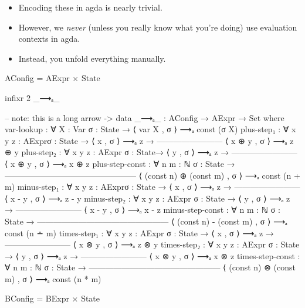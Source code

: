 \documentclass{lecturenotes}
\begin{document}
\begin{itemize}
\item Encoding these in agda is nearly trivial.
\item However, we \emph{never} (unless you really know what you're doing) use evaluation contexts in agda.
\item Instead, you unfold everything manually.
\end{itemize}
\begin{code}
AConfig = AExpr × State

infixr 2 _⟶ₐ_

-- note: this is a long arrow \-->
data _⟶ₐ_ : AConfig → AExpr → Set where
  var-lookup : ∀ {X : Var} {σ : State} →
    ⟨ var X , σ ⟩ ⟶ₐ const (σ X)
  plus-step₁ : ∀ {x y z : AExpr}{σ : State} →
         ⟨ x , σ ⟩ ⟶ₐ z →
    ------------------------
     ⟨ x ⊕ y , σ ⟩ ⟶ₐ z ⊕ y
  plus-step₂ : ∀ {x y z : AExpr} {σ : State}→
         ⟨ y , σ ⟩ ⟶ₐ z →
    ------------------------
     ⟨ x ⊕ y , σ ⟩ ⟶ₐ x ⊕ z
  plus-step-const : ∀ {n m : ℕ} {σ : State} →
    ------------------------------------------------
     ⟨ (const n) ⊕ (const m) , σ ⟩ ⟶ₐ const (n + m)
  minus-step₁ : ∀ {x y z : AExpr}{σ : State} →
         ⟨ x , σ ⟩ ⟶ₐ z →
    ------------------------
     ⟨ x - y , σ ⟩ ⟶ₐ z - y
  minus-step₂ : ∀ {x y z : AExpr} {σ : State} →
         ⟨ y , σ ⟩ ⟶ₐ z →
    ------------------------
     ⟨ x - y , σ ⟩ ⟶ₐ x - z
  minus-step-const : ∀ {n m : ℕ} {σ : State} →
    ------------------------------------------------
     ⟨ (const n) - (const m) , σ ⟩ ⟶ₐ const (n ∸ m) 
  times-step₁ : ∀ {x y z : AExpr} {σ : State} →
         ⟨ x , σ ⟩ ⟶ₐ z →
    ------------------------
     ⟨ x ⊗ y , σ ⟩ ⟶ₐ z ⊗ y
  times-step₂ : ∀ {x y z : AExpr} {σ : State} →
         ⟨ y , σ ⟩ ⟶ₐ z →
    ------------------------
     ⟨ x ⊗ y , σ ⟩ ⟶ₐ x ⊗ z
  times-step-const : ∀ {n m : ℕ} {σ : State} →
    ------------------------------------------------
     ⟨ (const n) ⊗ (const m) , σ ⟩ ⟶ₐ const (n * m)

BConfig = BExpr × State


\end{code}
\end{document}
